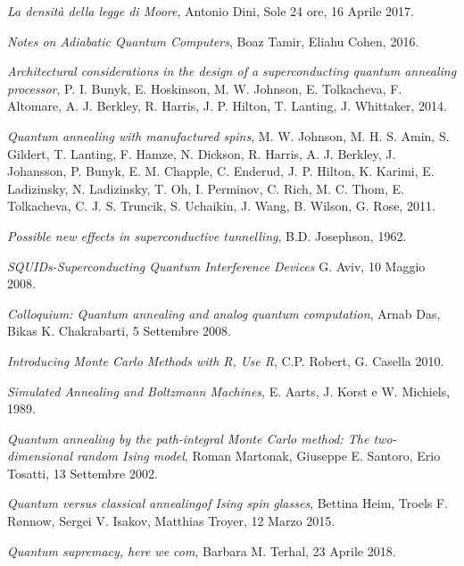 \newpage
\begin{thebibliography}{99}

    \textit{La densità della legge di Moore},
    Antonio Dini,
    Sole 24 ore,
    16 Aprile 2017.

    \textit{Notes on Adiabatic Quantum Computers},
    Boaz Tamir, Eliahu Cohen,
    2016.

    \textit{Architectural considerations in the design of a superconducting quantum annealing processor},
    P. I. Bunyk, E. Hoskinson, M. W. Johnson, E. Tolkacheva, F. Altomare, A. J. Berkley, R. Harris, J. P. Hilton, T. Lanting, J. Whittaker,
    2014.

    \textit{Quantum annealing with manufactured spins},
    M. W. Johnson, M. H. S. Amin, S. Gildert, T. Lanting, F. Hamze, N. Dickson, R. Harris, A. J. Berkley, J. Johansson, P. Bunyk, E. M. Chapple, C. Enderud, J. P. Hilton, K. Karimi, E. Ladizinsky, N. Ladizinsky, T. Oh, I. Perminov, C. Rich, M. C. Thom, E. Tolkacheva, C. J. S. Truncik, S. Uchaikin, J. Wang, B. Wilson, G. Rose,
    2011.

    \textit{Possible new effects in superconductive tunnelling},
    B.D. Josephson,
    1962.

    \textit{SQUIDs-Superconducting Quantum Interference Devices}
    G. Aviv,
    10 Maggio 2008.

    \textit{Colloquium: Quantum annealing and analog quantum computation},
    Arnab Das, Bikas K. Chakrabarti,
    5 Settembre 2008.

    \textit{Introducing Monte Carlo Methods with R, Use R},
    C.P. Robert, G. Casella
    2010.

    \textit{Simulated Annealing and Boltzmann Machines},
    E. Aarts, J. Korst e W. Michiels,
    1989.

    \textit{Quantum annealing by the path-integral Monte Carlo method: The two-dimensional random Ising model},
    Roman Martonak, Giuseppe E. Santoro, Erio Tosatti,
    13 Settembre 2002.

    \textit{Quantum versus classical annealingof Ising spin glasses},
    Bettina Heim, Troels F. Rønnow, Sergei V. Isakov, Matthias Troyer,
    12 Marzo 2015.

    \textit{Quantum supremacy, here we com},
    Barbara M. Terhal,
    23 Aprile 2018.


\end{thebibliography}

